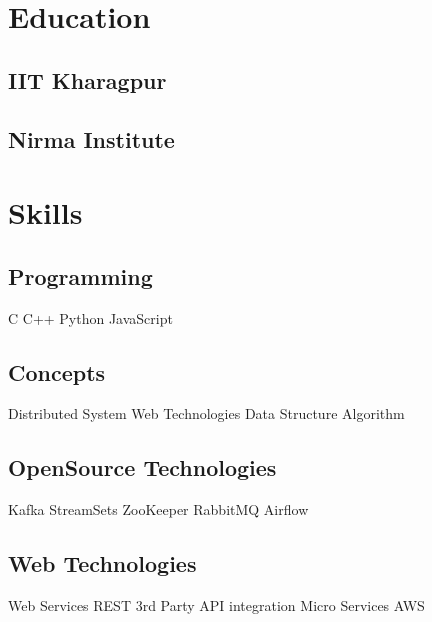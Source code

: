 \documentclass[]{deedy-resume-openfont}
\begin{document}
\begin{minipage}[t]{0.33\textwidth} 


\section{Education} 

\subsection{IIT Kharagpur}
\sectionsep

\subsection{Nirma Institute}
\sectionsep



\section{Skills}

\subsection{Programming}
C \textbullet{} C++  \textbullet{}  Python  \textbullet{} JavaScript
\vspace{2mm} 

\subsection{Concepts}
Distributed System \textbullet{} Web Technologies \textbullet{} Data Structure \textbullet{} Algorithm
\vspace{2mm} 

\subsection{OpenSource Technologies}
Kafka \textbullet{} StreamSets  \textbullet{}  ZooKeeper  \textbullet{} RabbitMQ \textbullet{} Airflow
\vspace{2mm} 

\subsection{Web Technologies}
Web Services \textbullet{} REST  \textbullet{} 3rd Party API integration \textbullet{} Micro Services  \textbullet{} AWS
\vspace{2mm} 


\end{minipage}
\end{document}
